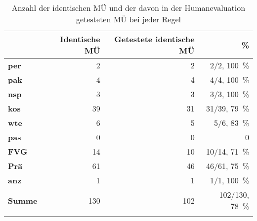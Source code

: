 \begin{table}


\begin{tabularx}{\textwidth}{Xrrr}
\lsptoprule
& {\bfseries Identische MÜ}	& {\bfseries Getestete identische MÜ}	& {\bfseries \%}\\
\midrule
{\bfseries per} &	2	& 2 &	2/2, 100~\%\\
{\bfseries pak}	& 4 & 4 &	4/4, 100~\%\\
{\bfseries nsp} &	3 &	3 &	3/3, 100~\%\\
{\bfseries kos}	& 39 &	31 &	31/39, 79~\%\\
{\bfseries wte}	& 6 &	5 &	5/6, 83~\%\\
{\bfseries pas}	& 0 &	0 &	0\\
{\bfseries FVG}	& 14	& 10	& 10/14, 71~\%\\
{\bfseries Prä} &	61 &	46 &	46/61, 75~\%\\
{\bfseries anz} & 1	& 1	& 1/1, 100~\%\\
\midrule
{\bfseries Summe} & 130 &	102 &	102/130, 78~\%\\
\lspbottomrule
\end{tabularx}
\caption{\label{tab:05:13} Anzahl der identischen MÜ und der davon in der Humanevaluation getesteten MÜ bei jeder Regel}
\end{table}


